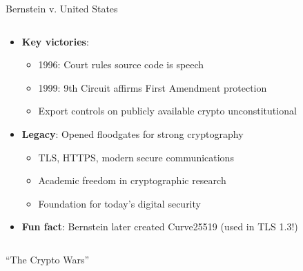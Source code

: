 \documentclass[aspectratio=169, lualatex, handout]{beamer}
\begin{document}
\begin{frame}{Bernstein v. United States}
	\begin{columns}[c]
		\begin{column}{0.7\textwidth}
			\begin{itemize}[<+->]
				\item \textbf{Key victories}:
				      \begin{itemize}
					      \item 1996: Court rules source code is speech
					      \item 1999: 9th Circuit affirms First Amendment protection
					      \item Export controls on publicly available crypto unconstitutional
				      \end{itemize}
				\item \textbf{Legacy}: Opened floodgates for strong cryptography
				      \begin{itemize}
					      \item TLS, HTTPS, modern secure communications
					      \item Academic freedom in cryptographic research
					      \item Foundation for today's digital security
				      \end{itemize}
				\item \textbf{Fun fact}: Bernstein later created Curve25519 (used in TLS 1.3!)
			\end{itemize}
		\end{column}
		\begin{column}{0.3\textwidth}
		\end{column}
	\end{columns}
\end{frame}

\begin{frame}{``The Crypto Wars''}
	\begin{columns}[c]
		\begin{column}{0.33\textwidth}
		\end{column}
		\begin{column}{0.33\textwidth}
		\end{column}
		\begin{column}{0.33\textwidth}
		\end{column}
	\end{columns}
\end{frame}
\end{document}
